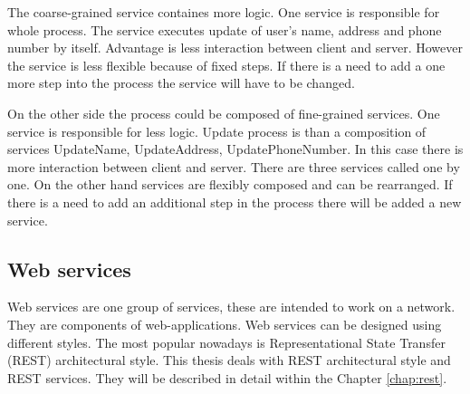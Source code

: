 The coarse-grained service containes more logic. One service is responsible for whole process. The service executes update of user's name, address and phone number by itself. Advantage is less interaction between client and server. However the service is less flexible because of fixed steps. If there is a need to add a one more step into the process the service will have to be changed.

On the other side the process could be composed of fine-grained services. One service is responsible for less logic. Update process is than a composition of services UpdateName, UpdateAddress, UpdatePhoneNumber. In this case there is more interaction between client and server. There are three services called one by one. On the other hand services are flexibly composed and can be rearranged. If there is a need to add an additional step in the process there will be added a new service.


\subsection{Web services}
Web services are one group of services, these are intended to work on a network. They are components of \gls{web-applications}. Web services can be designed using different styles. The most popular nowadays is Representational State Transfer (REST) architectural style. This thesis deals with REST architectural style and REST services. They will be described in detail within the Chapter \ref{chap:rest}.

